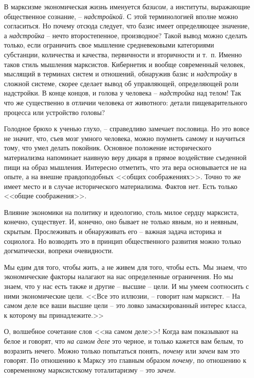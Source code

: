 \documentclass{book}
\begin{document}
В марксизме экономическая жизнь именуется \textit{базисом,} а институты, выражающие общественное сознание, -- 
\textit{надстройкой.} С этой терминологией вполне можно согласиться. Но почему отсюда следует, что базис имеет определяющее 
значение, а \textit{надстройка} -- нечто второстепенное, производное? Такой вывод можно сделать только, если ограничить свое 
мышление средневековыми категориями субстанции, количества и качества, первичности и вторичности и т.~п. Именно таков стиль 
мышления марксистов. Кибернетик и вообще современный человек, мыслящий в терминах систем и отношений, обнаружив базис  и 
\textit{надстройку}  в сложной системе, скорее сделает вывод об управляющей, определяющей роли надстройки.  В конце концов, и 
голова у человека -- \textit{надстройка}  над телом! Так что же существенно в отличии человека от животного: детали 
пищеварительного процесса или устройство головы?

Голодное брюхо к ученью глухо, -- справедливо замечает по­словица. Но это вовсе не значит, что, съев мозг умного человека, можно 
поумнеть самому и научиться тому, что умел делать по­койник. Основное положение исторического материализма на­поминает наивную 
веру дикаря в прямое воздействие съеденной пищи на образ мышления. Интересно отметить, что эта вера ос­новывается не на опыте, а 
на внешне правдоподобных <<общих соображениях>>. Точно то же имеет место и в случае историче­ского материализма. Фактов нет. Есть 
только <<общие сообра­жения>>.

Влияние экономики на политику и идеологию, столь милое сердцу марксиста, конечно, существует. И, конечно, оно бывает не только 
явным, но и неявным, скрытым. Прослеживать и обнаруживать его -- важная задача историка и социолога. Но воз­водить это в принцип 
общественного развития можно только догматически, вопреки очевидности.

Мы едим для того, чтобы жить, а не живем для того, чтобы есть. Мы знаем, что экономические факторы налагают на нас определенные 
ограничения. Но мы знаем, что у нас есть также и другие -- высшие -- цели. И мы умеем соотносить с ними экономические цели.
<<Все это иллюзии, -- говорит нам марксист. -- На самом деле все ваши высшие цели -- это ловко замаскированный интерес класса, к 
которому вы принадлежите.>>

О, волшебное сочетание слов <<на самом деле>>! Когда вам показывают на белое и говорят, что \textit{на самом деле}  это черное, и только кажется вам белым, то возразить нечего. Можно только попытаться понять, \textit{почему}  или \textit{зачем}  вам это говорят. По отношению к Марксу это главным образом \textit{почему,}  по отношению к современному марксистскому тоталитаризму -- это \textit{зачем.} 
\end{document}
